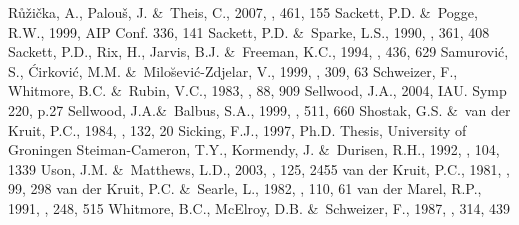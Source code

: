 \documentclass[traditabstract]{aa} %
\begin{document}
\begin{thebibliography}{}
R\r{u}\v{z}i\v{c}ka, A., Palou\v{s}, J. \&\ Theis, C., 2007, \aap, 461, 155
Sackett, P.D. \&\ Pogge, R.W., 1999, AIP Conf. 336, 141
Sackett, P.D. \&\ Sparke, L.S., 1990, \apj, 361, 408
Sackett, P.D., Rix, H., Jarvis, B.J. \&\ Freeman, K.C., 1994, \apj, 436, 629
Samurovi\'c, S., \'Cirkovi\'c, M.M. \&\ Milo\u{s}evi\'c-Zdjelar, V., 1999,
\mnras, 309, 63
Schweizer, F., Whitmore, B.C. \&\ Rubin, V.C., 1983, \aj, 88, 909
Sellwood, J.A., 2004, IAU. Symp 220, p.27 
Sellwood, J.A.\&\ Balbus, S.A., 1999, \apj, 511, 660
Shostak, G.S. \&\ van der Kruit, P.C., 1984, \aap, 132, 20
Sicking, F.J., 1997, Ph.D. Thesis, University of Groningen
Steiman-Cameron, T.Y., Kormendy, J. \&\ Durisen, R.H., 1992, \aj, 104, 1339
Uson, J.M. \&\ Matthews, L.D., 2003, \aj, 125, 2455
van der Kruit, P.C., 1981, \aap, 99, 298
van der Kruit, P.C. \&\ Searle, L., 1982, \aap, 110, 61
van der Marel, R.P., 1991, \mnras, 248, 515
Whitmore, B.C., McElroy, D.B. \&\ Schweizer, F., 1987, \apj, 314, 439
\end{thebibliography}
\end{document}
